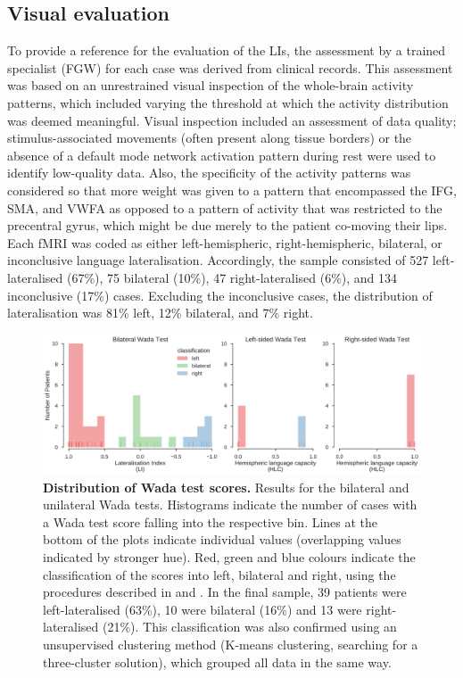 \documentclass[fleqn,10pt]{SelfArx} %
\begin{document}
\subsection{Visual evaluation}
To provide a reference for the evaluation of the LIs, the assessment by a trained specialist (FGW) for each case was derived from clinical records. This assessment was based on an unrestrained visual inspection of the whole-brain activity patterns, which included varying the threshold at which the activity distribution was deemed meaningful. Visual inspection included an assessment of data quality; stimulus-associated movements (often present along tissue borders) or the absence of a default mode network activation pattern during rest were used to identify low-quality data. Also, the specificity of the activity patterns was considered so that more weight was given to a pattern that encompassed the IFG, SMA, and VWFA as opposed to a pattern of activity that was restricted to the precentral gyrus, which might be due merely to the patient co-moving their lips. Each fMRI was coded as either left-hemispheric, right-hemispheric, bilateral, or inconclusive language lateralisation. Accordingly, the sample consisted of 527 left-lateralised (67\%), 75 bilateral (10\%), 47 right-lateralised (6\%), and 134 inconclusive (17\%) cases. Excluding the inconclusive cases, the distribution of lateralisation was 81\% left, 12\% bilateral, and 7\% right.

\begin{figure}[htb]
	\begin{minipage}{\textwidth}
		\renewcommand{\familydefault}{\sfdefault}\normalfont
		\centering
		\includegraphics[width=0.95\columnwidth]{../reports/figures/02-wada-score-distribution.png}
		\caption{\textbf{Distribution of Wada test scores.} 
			Results for the bilateral and unilateral Wada tests. Histograms indicate the number of cases with a Wada test score falling into the respective bin. Lines at the bottom of the plots indicate individual values (overlapping values indicated by stronger hue). Red, green and blue colours indicate the classification of the scores into left, bilateral and right, using the procedures described in \citet{Kurthen_1994} and \citet{Wellmer_2005}. In the final sample, 39 patients were left-lateralised (63\%), 10 were bilateral (16\%) and 13 were right-lateralised (21\%). This classification was also confirmed using an unsupervised clustering method (K-means clustering, searching for a three-cluster solution), which grouped all data in the same way.}%
		\label{fig:wada}
	\end{minipage}
\end{figure}
\end{document}
